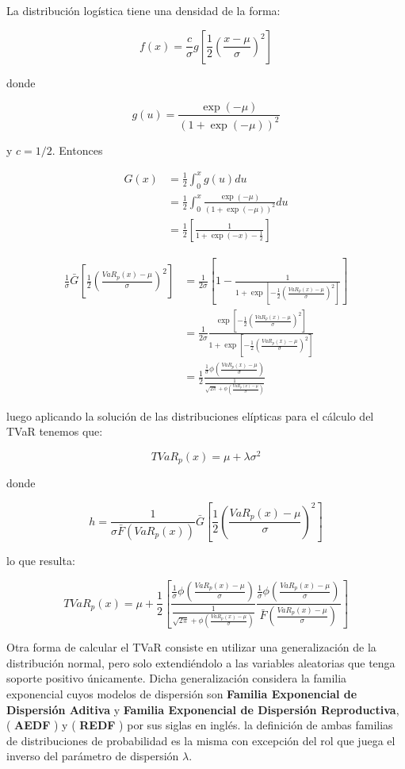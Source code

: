 \documentclass[]{article}
\begin{document}
La distribución logística tiene una densidad de la forma:

\[f(x)=\frac{c}{\sigma}g\left[\frac{1}{2}\left(\frac{x-\mu}{\sigma}\right)^2\right]\]

donde

\[g(u)= \frac{\exp(-\mu)}{(1+ \exp(-\mu))^2}\]

y \(c=1/2\). Entonces

\[\begin{array}{rl}
G(x) &\displaystyle=\frac{1}{2}\int_{0}^{x}g(u)du\\
&\displaystyle=\frac{1}{2}\int_{0}^{x}\frac{\exp(-\mu)}{(1+ \exp(-\mu))^2}du\\
&\displaystyle=\frac{1}{2}\left[\frac{1}{1+\exp(-x)-\frac{1}{2}}\right]
\end{array}\]

\[\begin{array}{rl}
\frac{1}{\sigma} \bar{G}\left[\frac{1}{2}\left(\frac{VaR_p(x)-\mu}{\sigma}\right)^2\right] &\displaystyle= \frac{1}{2 \sigma} \left[1-\frac{1}{1+ \exp\left[-\frac{1}{2}\left(\frac{VaR_p(x)-\mu}{\sigma}\right)^2\right]}\right]\\
&\displaystyle
= \frac{1}{2 \sigma}\frac{\exp\left[-\frac{1}{2} \left(\frac{VaR_p(x)-\mu}{\sigma}\right)^2\right]}{1+ \exp \left[-\frac{1}{2} \left(\frac{VaR_p(x)-\mu}{\sigma}\right)^2\right]}\\
&\displaystyle= \frac{1}{2} \frac{ \frac{1}{\sigma}\phi\left(\frac{VaR_p(x)-\mu}{\sigma}\right)}{\frac{1}{\sqrt{2\pi}+\phi\left(\frac{VaR_p(x)-\mu}{\sigma}\right)}}
\end{array}\]

luego aplicando la solución de las distribuciones elípticas para el
cálculo del TVaR tenemos que:

\[TVaR_p(x)= \mu + \lambda \sigma^2\]

donde

\[h=\frac{1}{\sigma \bar{F}(VaR_p(x))}\bar{G} \left[\frac{1}{2} \left(\frac{VaR_p(x)-\mu}{\sigma}\right)^2\right]\]

lo que resulta:

\[TVaR_p(x)= \mu + \frac{1}{2} \left[\frac{ \frac{1}{\sigma}\phi\left(\frac{VaR_p(x)-\mu}{\sigma}\right)}{\frac{1}{\sqrt{2\pi}+\phi\left(\frac{VaR_p(x)-\mu}{\sigma}\right)}}\frac{ \frac{1}{\sigma}\phi\left(\frac{VaR_p(x)-\mu}{\sigma}\right)}{\bar{F}(\frac{VaR_p(x)-\mu}{\sigma})} \right]\]

Otra forma de calcular el TVaR consiste en utilizar una generalización
de la distribución normal, pero solo extendiéndolo a las variables
aleatorias que tenga soporte positivo únicamente. Dicha generalización
considera la familia exponencial cuyos modelos de dispersión son
\textbf{Familia Exponencial de Dispersión Aditiva} y \textbf{Familia
Exponencial de Dispersión Reproductiva}, ( \textbf{AEDF} ) y (
\textbf{REDF} ) por sus siglas en inglés. la definición de ambas
familias de distribuciones de probabilidad es la misma con excepción del
rol que juega el inverso del parámetro de dispersión \(\lambda\).
\end{document}
